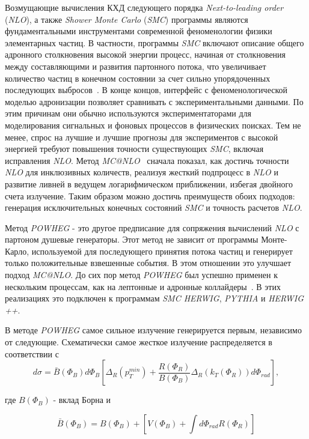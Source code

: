 Возмущающие вычисления КХД следующего порядка \textit{Next-to-leading order} (\textit{NLO}), а также \textit{Shower Monte Carlo}
(\textit{SMC}) программы являются фундаментальными инструментами современной феноменологии физики элементарных частиц. В частности, программы \textit{SMC} включают описание общего адронного столкновения высокой энергии
процесс, начиная от столкновения между составляющими и развития партонного потока, что
увеличивает количество частиц в конечном состоянии за счет сильно упорядоченных последующих выбросов~\cite{review-powheg}.
В конце концов, интерфейс с феноменологической моделью адронизации позволяет сравнивать
с экспериментальными данными. По этим причинам они обычно используются экспериментаторами для
моделирования сигнальных и фоновых процессов в физических поисках. Тем не менее, спрос на
лучшие и лучшие прогнозы для экспериментов с высокой энергией требуют повышения точности
существующих \textit{SMC}, включая исправления \textit{NLO}. Метод \textit{MC@NLO}~\cite{review-powheg} сначала показал, как
достичь точности \textit{NLO} для инклюзивных количеств, реализуя жесткий подпроцесс в \textit{NLO} и
развитие ливней в ведущем логарифмическом приближении, избегая двойного счета
излучение. Таким образом можно достичь преимуществ обоих подходов: генерация исключительных конечных состояний
\textit{SMC} и точность расчетов \textit{NLO}.

Метод \textit{POWHEG} - это другое предписание для сопряжения вычислений \textit{NLO} с партоном
душевые генераторы.
Этот метод не зависит от программы Монте-Карло, используемой для последующего принятия потока частиц и
генерирует только положительные взвешенные события. В этом отношении это улучшает подход \textit{MC@NLO}.
До сих пор метод \textit{POWHEG} был успешно применен к нескольким процессам, как на
лептонные и адронные коллайдеры~\cite{review-powheg}. В этих реализациях это
подключен к программам \textit{SMC HERWIG}, \textit{PYTHIA} и \textit{HERWIG ++}.

В методе \textit{POWHEG} самое сильное излучение
генерируется первым, независимо от
следующие. Схематически
самое жесткое излучение распределяется в соответствии с
\[ 
	d\sigma = \bar{B} ({\Phi}_{B}) d{\Phi}_{B}[{\Delta}_{R}({p}_{T}^{min}) + \frac{R({\Phi}_{R})}{B({\Phi}_{B})}{\Delta}_{R}({k}_{T}({\Phi}_{R}))d{\Phi}_{rad}],
\]

где $B({\Phi}_{B})$ - вклад Борна и

\[ 
	\bar{B}({\Phi}_{B}) = B({\Phi}_{B}) + [V({\Phi}_{B}) + \int d{\Phi}_{rad}R({\Phi}_{R})]
\]

